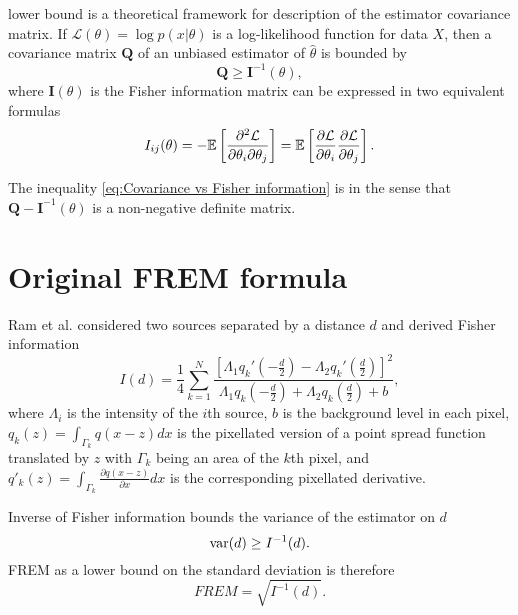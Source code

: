 \CR lower bound is a theoretical framework for description of the estimator covariance matrix. If $\mathcal{L}(\theta)=\log p(x|\theta)$ is a log-likelihood function for data $X$, then a covariance matrix $\bm{Q}$ of an unbiased estimator of $\hat{\theta}$ is bounded by \cite{Rao1945,Cover1991} 
%
\begin{equation}
	\bm{Q}\geq\bm{I}^{-1}(\theta),
	\label{eq:Covariance vs Fisher information}
\end{equation}
%
where $\bm{I}(\theta)$ is the Fisher information matrix can be expressed in two equivalent formulas
%
\begin{equation}
	I_{ij}(\theta)=-\mathbb{E}\left[\frac{\partial^2\mathcal{L}}{\partial\theta_i\partial\theta_j}\right]=\mathbb{E}\left[\frac{\partial\mathcal{L}}{\partial\theta_i}\frac{\partial\mathcal{L}}{\partial\theta_j}\right].
	\label{eq:Fisher information general}
\end{equation}

The inequality \autoref{eq:Covariance vs Fisher information} is in the sense that $\bm{Q}-\bm{I}^{-1}(\theta)$ is a non-negative definite matrix.

\section{Original FREM formula\label{sec:FREM orig}}

Ram et al. \cite{Ram2006} considered two sources separated by a distance $d$ and derived Fisher information
%
\begin{equation}
	I(d)=\frac{1}{4}\sum_{k=1}^N\frac{\left[\Lambda_1q_k'(-\frac{d}{2})-\Lambda_2q_k'(\frac{d}{2})\right]^2}{\Lambda_1q_k(-\frac{d}{2})+\Lambda_2q_k(\frac{d}{2})+b},
	\label{eq:Ram FREM}
\end{equation}
%
where $\Lambda_i$ is the intensity of the $i$th source, $b$ is the background level in each pixel, $q_k(z)=\int_{\Gamma_k}q(x-z)dx$ is the pixellated version of a point spread function translated by $z$ with $\Gamma_k$ being an area of the $k$th pixel, and $q'_k(z)=\int_{\Gamma_k}\frac{\partial q(x-z)}{\partial x}dx$ is the corresponding pixellated derivative. 

Inverse of Fisher information bounds the variance of the estimator on $d$ 
%
\begin{equation}
	\mathrm{var}(d)\geq I^{-1}(d).
\end{equation}
%
FREM as a lower bound on the standard deviation is therefore
%
\begin{equation}
	\unit{FREM}=\sqrt{I^{-1}(d)}.
	\label{eq:FREM}	
\end{equation}

